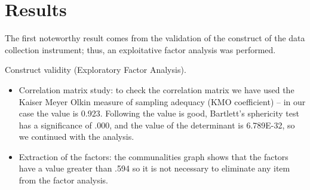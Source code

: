 \documentclass[english]{textolivre}
\begin{document}
\section{Results}\label{sec-conduta}
The first noteworthy result comes from the validation of the construct of the data collection instrument; thus, an exploitative factor analysis was performed. 

Construct validity (Exploratory Factor Analysis).

\begin{itemize}
    \item Correlation matrix study: to check the correlation matrix we have used the Kaiser Meyer Olkin measure of sampling adequacy (KMO coefficient) -- in our case the value is 0.923. Following \textcite[p. 35]{kaiser_index_1974} the value is good, Bartlett's sphericity test has a significance of .000, and the value of the determinant is 6.789E-32, so we continued with the analysis.
    \item Extraction of the factors: the communalities graph shows that the factors have a value greater than .594 so it is not necessary to eliminate any item from the factor analysis. 
    

\end{itemize}
\end{document}
